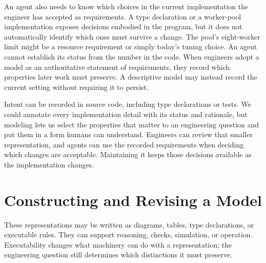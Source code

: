 
An agent also needs to know which choices in the current implementation the engineer has accepted as requirements. A type declaration or a worker-pool implementation exposes decisions embodied in the program, but it does not automatically identify which ones must survive a change. The pool's eight-worker limit might be a resource requirement or simply today's tuning choice. An agent cannot establish its status from the number in the code. When engineers adopt a model as an authoritative statement of requirements, they record which properties later work must preserve. A descriptive model may instead record the current setting without requiring it to persist.

Intent can be recorded in source code, including type declarations or tests. We could annotate every implementation detail with its status and rationale, but modeling lets us select the properties that matter to an engineering question and put them in a form humans can understand. Engineers can review that smaller representation, and agents can use the recorded requirements when deciding which changes are acceptable. Maintaining it keeps those decisions available as the implementation changes.

\section{Constructing and Revising a Model}\label{heading:constructing-and-revising-a-model}


These representations may be written as diagrams, tables, type declarations, or executable rules. They can support reasoning, checks, simulation, or operation. Executability changes what machinery can do with a representation; the engineering question still determines which distinctions it must preserve.

